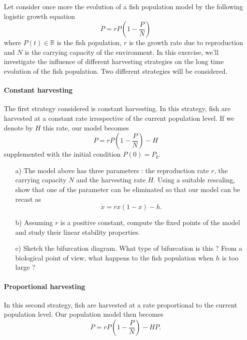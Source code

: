 \begin{problem}
  Let consider once more the evolution of a fish population model by the following logistic growth equation
  \[
  \dot{P} = r P \left( 1 - \dfrac{P}{N} \right)
  \]
  where $P(t) \in \mathbb{R}$ is the fish population, $r$ is the growth rate due to reproduction and $N$ is the carrying capacity of the environment.
  In this exercise, we'll investigate the influence of different harvesting strategies on the long time evolution of the fish population.
  Two different strategies will be considered.

  \paragraph{Constant harvesting}
  The first strategy considered is constant harvesting.
  In this strategy, fish are harvested at a constant rate irrespective of the current population level.
  If we denote by $H$ this rate, our model becomes
  \[
  \dot{P} = r P \left( 1 - \dfrac{P}{N} \right) - H
  \]
  supplemented with the initial condition $P(0) = P_0$.

  \bigskip

  \begin{enumerate}
  \item[a)] The model above has three parameters : the reproduction rate $r$, the carrying capacity $N$ and the harvesting rate $H$.
    Using a suitable rescaling, show that one of the parameter can be eliminated so that our model can be recast as
    \[
    \dot{x} = r x \left( 1 - x \right) - h.
    \]

  \item[b)] Assuming $r$ is a positive constant, compute the fixed points of the model and study their linear stability properties.

  \item[c)] Sketch the bifurcation diagram.
    What type of bifurcation is this ?
    From a biological point of view, what happens to the fish population when $h$ is too large ?

  \end{enumerate}

  \paragraph{Proportional harvesting}
  In this second strategy, fish are harvested at a rate proportional to the current population level.
  Our population model then becomes
  \[
  \dot{P} = r P \left( 1 - \dfrac{P}{N} \right) - HP.
  \]


\end{problem}
